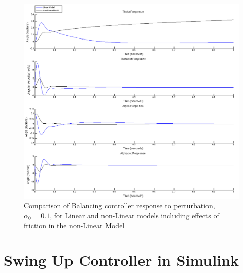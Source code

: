 \documentclass{article}
\theoremstyle{plain}
\theoremstyle{definition}
\theoremstyle{remark}
\begin{document}
\begin{figure}
\begin{center}
\includegraphics[width = 16cm]{nonlinearvslinearwF.png}
\end{center}
\caption{Comparison of Balancing controller response to perturbation, $\alpha_0 = 0.1$, for Linear and non-Linear models including effects of friction in the non-Linear Model}
\label{LvsNonLwF}
\end{figure}

\clearpage
\section{Swing Up Controller in Simulink}
\end{document}
